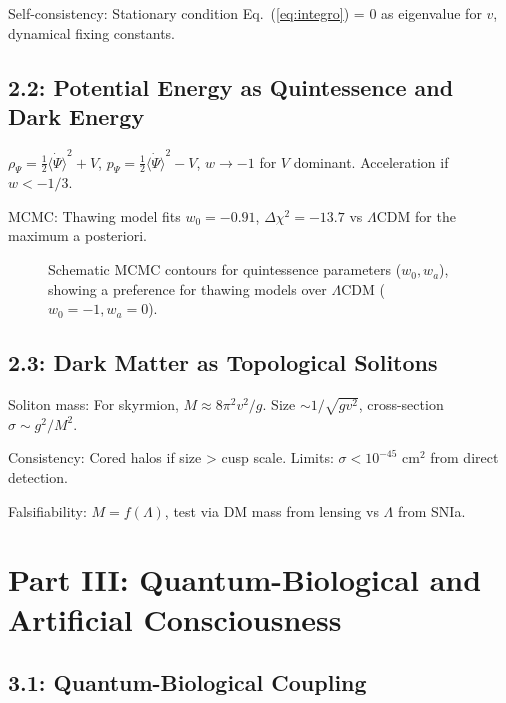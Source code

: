 \documentclass[12pt]{article}
\theoremstyle{definition}
\begin{document}
Self-consistency: Stationary condition Eq.~(\ref{eq:integro}) = 0 as eigenvalue for $v$, dynamical fixing constants.

\subsection{2.2: Potential Energy as Quintessence and Dark Energy}

$\rho_\Psi = \frac{1}{2} \dot{\langle \Psi \rangle}^2 + V$, $p_\Psi = \frac{1}{2} \dot{\langle \Psi \rangle}^2 - V$, $w \to -1$ for $V$ dominant. Acceleration if $w < -1/3$.

MCMC: Thawing model fits $w_0 = -0.91$, $\Delta \chi^2 = -13.7$ vs $\Lambda$CDM for the maximum a posteriori.

\begin{figure}[htbp]
\centering
{}
\caption{Schematic MCMC contours for quintessence parameters ($w_0, w_a$), showing a preference for thawing models over $\Lambda$CDM ($w_0=-1, w_a=0$).}
\label{fig:mcmc}
\end{figure}

\subsection{2.3: Dark Matter as Topological Solitons}

Soliton mass: For skyrmion, $M \approx 8\pi^2 v^2 / g$. Size $\sim 1/\sqrt{g v^2}$, cross-section $\sigma \sim g^2 / M^2$.

Consistency: Cored halos if size > cusp scale. Limits: $\sigma < 10^{-45}$ cm$^2$ from direct detection.

Falsifiability: $M = f(\Lambda)$, test via DM mass from lensing vs $\Lambda$ from SNIa.

\section{Part III: Quantum-Biological and Artificial Consciousness}

\subsection{3.1: Quantum-Biological Coupling}
\end{document}
